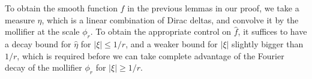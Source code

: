 \documentclass[12pt,reqno]{article}
\numberwithin{equation}{section}
\DeclareMathOperator{\ZZ}{\mathbf{Z}}
\DeclareMathOperator{\TT}{\mathbf{T}}
\newtheorem{lemma}[theorem]{Lemma}
\numberwithin{theorem}{section}
\begin{document}
To obtain the smooth function $f$ in the previous lemmas in our proof, we take a measure $\eta$, which is a linear combination of Dirac deltas, and convolve it by the mollifier at the scale $\phi_r$. To obtain the appropriate control on $\widehat{f}$, it suffices to have a decay bound for $\widehat{\eta}$ for $|\xi| \leq 1/r$, and a weaker bound for $|\xi|$ slightly bigger than $1/r$, which is required before we can take complete advantage of the Fourier decay of the mollifier $\phi_r$ for $|\xi| \geq 1/r$.

\begin{comment}

\begin{lemma} \label{Lemma65493}
    Fix $C > 0$, $r,\varepsilon_1 > 0$, and $\beta \in (0,d/2]$. Consider $K$ points $x_1, \dots, x_K \in \TT^d$ such that for each $\xi \in \ZZ^d$ with $0 < |\xi| \leq 1/r^{1+\varepsilon_1}$,
    \begin{equation} \label{equationOIJDOIJIO}
        \left| \frac{1}{K} \sum_{i = 1}^K e^{2 \pi i x_i \cdot \xi} \right| \leq C |\xi|^{-\beta}.
    \end{equation}
    Then if we define
    \[ f(x) = \frac{1}{K} \sum_{i = 1}^K \phi_{r}(x - x_i), \]
    then $\| f \|_{M(\beta-\varepsilon_1)} \lesssim_{d,\varepsilon_1} C$.
\end{lemma}
\begin{proof}
    Set
    \[ D(x) = \frac{1}{K} \sum_{i = 1}^K \delta(x - x_i), \]
    then \eqref{equationOIJDOIJIO} is equivalent to the property that for each $\xi \in \ZZ^d$ with $0 < |\xi| \leq 1/r^{1 + \varepsilon_1}$,
    \begin{equation} \label{equationFFOSOXPFFGHI}
        |\widehat{D}(\xi)| \leq C |\xi|^{-\beta}.
    \end{equation}
    Noting that $f = D * \phi_{r}$, we conclude that
    \begin{equation} \label{equation6666GGCIS}
        |\widehat{f}| = |\widehat{D}| |\widehat{\phi_{r}}|.
    \end{equation}
    For $0 < |\xi| \leq 1/r^{1 + \varepsilon_1}$, we combine \eqref{equationFFOSOXPFFGHI}, \eqref{equation6666GGCIS} and \eqref{equationDIOJAOIJVIV23242} to conclude that
    \begin{equation} \label{equationGGIOHISI99234}
        |\widehat{f}(\xi)| \leq C |\xi|^{-\beta} \leq C |\xi|^{\varepsilon_1 - \beta}.
    \end{equation}
    For $|\xi| \geq 1/r^{1 + \varepsilon_1}$, we note that \eqref{molificationdecaybound} implies $\widehat{\phi_{r}}(\xi) \lesssim_T r^{-T} |\xi|^{-T}$, and so if $T \geq \beta$,
    \begin{equation} \label{equationDIICCCJSXVVM21}
        |\widehat{f}(\xi)| \lesssim_T [r^{-T} |\xi|^{\beta-T}] |\xi|^{-\beta} \leq [r^{-T} r^{-(1+\varepsilon_1)(\beta-T)}] |\xi|^{-\beta} \leq r^{-(1+\varepsilon_1) \beta + \varepsilon_1 T} |\xi|^{-\beta}.
    \end{equation}
    Setting $T = (1 + 1/\varepsilon_1) \cdot \beta$ gives $|\widehat{f}(\xi)| \lesssim_{\varepsilon_1,d} |\xi|^{-\beta}$.
\end{proof}


\end{comment}
\end{document}
